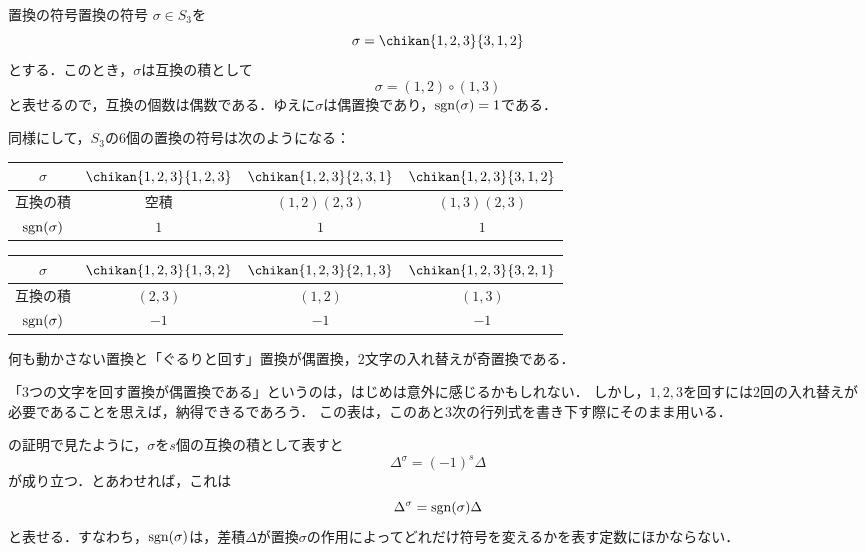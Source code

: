 \begin{example}{置換の符号}{置換の符号}
  $\sigma \in S_3$を
  \[
  \sigma = \chikan{1, 2, 3}{3, 1, 2}
  \]
  とする．このとき，$\sigma$は互換の積として
  \[
  \sigma = (1, 2) \circ (1, 3)
  \]
  と表せるので，互換の個数は偶数である．ゆえに$\sigma$は偶置換であり，$\operatorname{sgn}(\sigma) = 1$である．

  同様にして，$S_3$の$6$個の置換の符号は次のようになる：
  \begin{center}
    \renewcommand{\arraystretch}{0.75}
    \newcommand{\chikanstrut}{\rule[-1.4em]{0pt}{3.4em}}
    \newcommand{\rowstrut}{\rule[-0.6em]{0pt}{1.8em}}
    \begin{tabular}{c|ccc}
      $\sigma$\chikanstrut
        & $\chikan{1,2,3}{1,2,3}$ & $\chikan{1,2,3}{2,3,1}$ & $\chikan{1,2,3}{3,1,2}$ \\ \hline
      互換の積\rowstrut & 空積 & $(1,2)(2,3)$ & $(1,3)(2,3)$ \\
      $\operatorname{sgn}(\sigma)$\rowstrut & $1$ & $1$ & $1$
    \end{tabular}
    \par\medskip
    \begin{tabular}{c|ccc}
      $\sigma$\chikanstrut
        & $\chikan{1,2,3}{1,3,2}$ & $\chikan{1,2,3}{2,1,3}$ & $\chikan{1,2,3}{3,2,1}$ \\ \hline
      互換の積\rowstrut & $(2,3)$ & $(1,2)$ & $(1,3)$ \\
      $\operatorname{sgn}(\sigma)$\rowstrut & $-1$ & $-1$ & $-1$
    \end{tabular}
  \end{center}
  何も動かさない置換と「ぐるりと回す」置換が偶置換，$2$文字の入れ替えが奇置換である．
\end{example}

「$3$つの文字を回す置換が偶置換である」というのは，はじめは意外に感じるかもしれない．
しかし，$1, 2, 3$を回すには$2$回の入れ替えが必要であることを思えば，納得できるであろう．
この表は，このあと$3$次の行列式を書き下す際にそのまま用いる．

の証明で見たように，$\sigma$を$s$個の互換の積として表すと
\[
\Delta^\sigma = (-1)^s \Delta
\]
が成り立つ．とあわせれば，これは
\[
\Delta^\sigma = \operatorname{sgn}(\sigma) \Delta
\]
と表せる．すなわち，$\operatorname{sgn}(\sigma)$は，差積$\Delta$が置換$\sigma$の作用によってどれだけ符号を変えるかを表す定数にほかならない．

